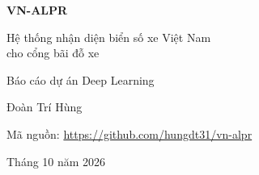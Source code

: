 \begin{titlepage}
  \centering
  \vspace*{3cm}
  {\LARGE\bfseries VN-ALPR\par}
  \vspace{0.6cm}
  {\Large Hệ thống nhận diện biển số xe Việt Nam\\cho cổng bãi đỗ xe\par}
  \vspace{1.2cm}
  {\large Báo cáo dự án Deep Learning\par}
  \vspace{2.5cm}
  {\large Đoàn Trí Hùng\par}
  \vspace{0.3cm}
  {\normalsize Mã nguồn: \url{https://github.com/hungdt31/vn-alpr}\par}
  \vfill
  {\large Tháng 10 năm 2026\par}
\end{titlepage}
